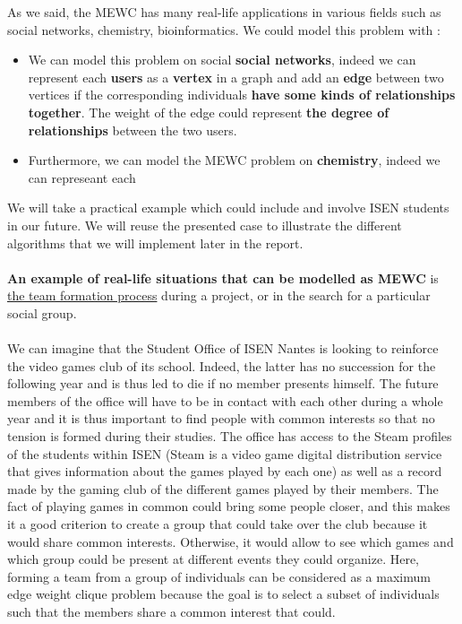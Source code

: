     As we said, the MEWC has many real-life applications in various fields such as social networks, chemistry, bioinformatics. We could model this problem with :
    \begin{itemize}
        \item We can model this problem on social \textbf{social networks}, indeed we can represent each \textbf{users} as a \textbf{vertex} in a graph and add an \textbf{edge} between two vertices if the corresponding individuals \textbf{have some kinds of relationships together}. The weight of the edge could represent \textbf{the degree of relationships} between the two users.
        \item Furthermore, we can model the MEWC problem on \textbf{chemistry}, indeed we can represeant each \textbf{} %
    \end{itemize}
    We will take a practical example which could include and involve ISEN students in our future. We will reuse the presented case to illustrate the different algorithms that we will implement later in the report.\\ \\
    \textbf{An example of real-life situations that can be modelled as MEWC} is \ul{the team formation process} during a project, or in the search for a particular social group. 
    \\ \\
    We can imagine that the Student Office of ISEN Nantes is looking to reinforce the video games club of its school. Indeed, the latter has no succession for the following year and is thus led to die if no member presents himself. The future members of the office will have to be in contact with each other during a whole year and it is thus important to find people with common interests so that no tension is formed during their studies. The office has access to the Steam profiles of the students within ISEN (Steam is a video game digital distribution service that gives information about the games played by each one) as well as a record made by the gaming club of the different games played by their members. The fact of playing games in common could bring some people closer, and this makes it a good criterion to create a group that could take over the club because it would share common interests. Otherwise, it would allow to see which games and which group could be present at different events they could organize. Here, forming a team from a group of individuals can be considered as a maximum edge weight clique problem because the goal is to select a subset of individuals such that the members share a common interest that could.
